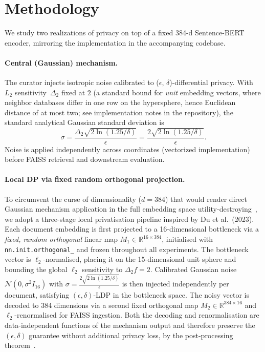 \documentclass[11pt, a4paper]{article}
\begin{document}
\section{Methodology}

We study two realizations of privacy on top of a fixed 384-d Sentence-BERT
encoder, mirroring the implementation in the accompanying codebase.

\paragraph{Central (Gaussian) mechanism.}
The curator injects isotropic noise calibrated to ($\epsilon$, $\delta$)-differential
privacy. With $L_2$ sensitivity~$\Delta_2$ fixed at $2$ (a standard bound for
\emph{unit} embedding vectors, where neighbor databases differ in one row on the
hypersphere, hence Euclidean distance of at most two; see implementation notes in the
repository), the standard analytical Gaussian standard deviation is
\begin{equation}
  \sigma
  = \frac{\Delta_2 \sqrt{2 \ln(1.25 / \delta)}}{\epsilon}
  = \frac{2\sqrt{2\ln(1.25/\delta)}}{\epsilon} .
  \label{eq:central-gauss}
\end{equation}
Noise is applied independently across coordinates (vectorized implementation) before
FAISS retrieval and downstream evaluation.

\paragraph{Local DP via fixed random orthogonal projection.}
To circumvent the curse of dimensionality ($d = 384$) that would render
direct Gaussian mechanism application in the full embedding space
utility-destroying~\cite{du2023sanitizing}, we adopt a three-stage local
privatisation pipeline inspired by Du et al.\ (2023). Each document embedding
is first projected to a 16-dimensional bottleneck via a \emph{fixed, random
orthogonal} linear map $M_1 \in \mathbb{R}^{16 \times 384}$, initialised with
\texttt{nn.init.orthogonal\_} and frozen throughout all experiments. The
bottleneck vector is $\ell_2$-normalised, placing it on the 15-dimensional
unit sphere and bounding the global $\ell_2$ sensitivity to $\Delta_2 f = 2$.
Calibrated Gaussian noise $\mathcal{N}(0, \sigma^2 I_{16})$ with
$\sigma = \frac{2\sqrt{2\ln(1.25/\delta)}}{\epsilon}$ is then injected
independently per document, satisfying $(\epsilon, \delta)$-LDP in the
bottleneck space. The noisy vector is decoded to 384 dimensions via a second
fixed orthogonal map $M_2 \in \mathbb{R}^{384 \times 16}$ and $\ell_2$-renormalised
for FAISS ingestion. Both the decoding and renormalisation are
data-independent functions of the mechanism output and therefore preserve the
$(\epsilon, \delta)$ guarantee without additional privacy loss, by the
post-processing theorem~\cite[Prop.~2.1]{dwork2014algorithmic}.
\end{document}
